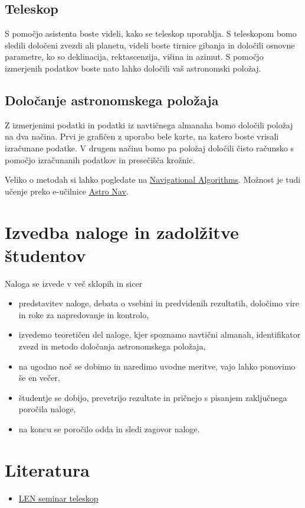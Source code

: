 \subsection{Teleskop}
S pomočjo asistenta boste videli, kako se teleskop uporablja. S teleskopom bomo sledili določeni zvezdi ali planetu, videli boste tirnice gibanja in določili osnovne parametre, ko so deklinacija, rektascenzija, višina in azimut. S pomočjo izmerjenih podatkov boste nato lahko določili vaš astronomski položaj.

\subsection{Določanje astronomskega položaja}
Z izmerjenimi podatki in podatki iz navtičnega almanaha bomo določili položaj na dva načina. Prvi je grafičen z uporabo bele karte, na katero boste vrisali izračunane podatke. V drugem načinu bomo pa položaj določili čisto računsko s pomočjo izračunanih podatkov in presečišča krožnic. 

Veliko o metodah si lahko pogledate na \href{https://sites.google.com/site/navigationalalgorithms}{Navigational Algorithms}. Možnost je tudi učenje preko e-učilnice \href{https://my.vanderbilt.edu/astronav}{Astro Nav}.

\section{Izvedba naloge in zadolžitve študentov}
Naloga se izvede v več sklopih in sicer

\begin{itemize}
	\item predstavitev naloge, debata o vsebini in predvidenih rezultatih, določimo vire in roke za napredovanje in kontrolo,
	\item izvedemo teoretičen del naloge, kjer spoznamo navtični almanah, identifikator zvezd in metodo določanja astronomskega položaja,
	\item na ugodno noč se dobimo in naredimo uvodne meritve, vajo lahko ponovimo še en večer,
	\item študentje se dobijo, prevetrijo rezultate in pričnejo s pisanjem zaključnega poročila naloge,
	\item na koncu se poročilo odda in sledi zagovor naloge.  
\end{itemize}

\section*{Literatura}
\begin{itemize}
	\item \href{https://drive.google.com/open?id=0B1dT-CBA07ANZGNEUlc1MEtlZXM}{LEN seminar teleskop}
\end{itemize}